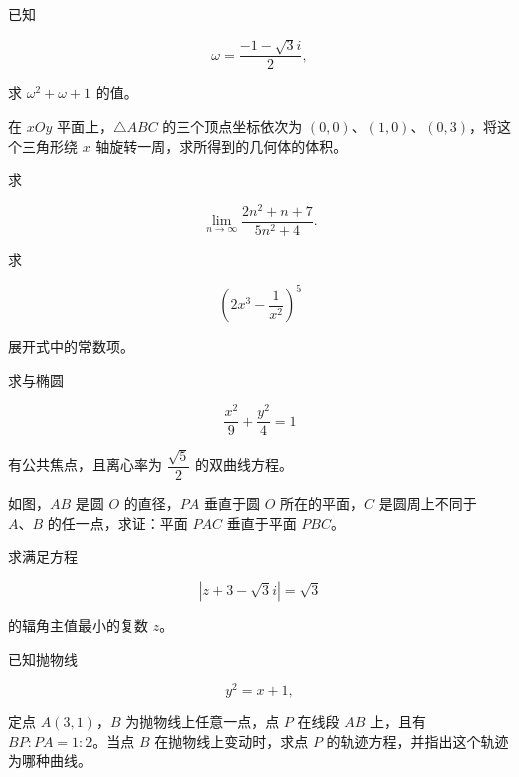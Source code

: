 \begin{question}
已知

\nopagebreak[4]
\[
\omega=\frac{-1-\sqrt3i}{2},
\]

求 $\omega^2+\omega+1$ 的值。

\end{question}
\begin{question}
在 $xOy$ 平面上，$\triangle ABC$ 的三个顶点坐标依次为 $(0,0)$、$(1,0)$、$(0,3)$，将这个三角形绕 $x$ 轴旋转一周，求所得到的几何体的体积。

\end{question}
\begin{question}
求

\nopagebreak[4]
\[
\lim_{n\to\infty}\frac{2n^2+n+7}{5n^2+4}.
\]

\end{question}
\begin{question}
求

\nopagebreak[4]
\[
\left(2x^3-\frac1{x^2}\right)^5
\]

展开式中的常数项。

\end{question}
\begin{question}
求与椭圆

\nopagebreak[4]
\[
\frac{x^2}{9}+\frac{y^2}{4}=1
\]

有公共焦点，且离心率为 $\dfrac{\sqrt5}{2}$ 的双曲线方程。

\Needspace{0.4\textheight}
\end{question}
\begin{question}
如图，$AB$ 是圆 $O$ 的直径，$PA$ 垂直于圆 $O$ 所在的平面，$C$ 是圆周上不同于 $A\text{、}B$ 的任一点，求证：平面 $PAC$ 垂直于平面 $PBC$。
\nopagebreak[4]
\begin{center}\end{center}
\nopagebreak[4]
\end{question}
\begin{question}
求满足方程

\nopagebreak[4]
\[
|z+3-\sqrt3i|=\sqrt3
\]

的辐角主值最小的复数 $z$。

\end{question}
\begin{question}
已知抛物线

\nopagebreak[4]
\[
y^2=x+1,
\]

定点 $A(3,1)$，$B$ 为抛物线上任意一点，点 $P$ 在线段 $AB$ 上，且有 $BP:PA=1:2$。当点 $B$ 在抛物线上变动时，求点 $P$ 的轨迹方程，并指出这个轨迹为哪种曲线。

\end{question}
